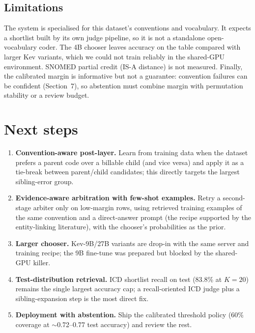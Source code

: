 \documentclass[11pt]{article}
\begin{document}
\subsection{Limitations}
The system is specialised for this dataset's conventions and vocabulary. It expects a
shortlist built by its own judge pipeline, so it is not a standalone open-vocabulary coder.
The 4B chooser leaves accuracy on the table compared with larger Kev variants, which we
could not train reliably in the shared-GPU environment. SNOMED partial credit (IS-A
distance) is not measured. Finally, the calibrated margin is informative but not a guarantee:
convention failures can be confident (Section~7), so abstention must combine margin with
permutation stability or a review budget.

\section{Next steps}
\begin{enumerate}[leftmargin=1.2em]
  \item \textbf{Convention-aware post-layer.} Learn from training data when the dataset
  prefers a parent code over a billable child (and vice versa) and apply it as a tie-break
  between parent/child candidates; this directly targets the largest sibling-error group.
  \item \textbf{Evidence-aware arbitration with few-shot examples.} Retry a second-stage
  arbiter only on low-margin rows, using retrieved training examples of the same convention
  and a direct-answer prompt (the recipe supported by the entity-linking literature), with
  the chooser's probabilities as the prior.
  \item \textbf{Larger chooser.} Kev-9B/27B variants are drop-in with the same server and
  training recipe; the 9B fine-tune was prepared but blocked by the shared-GPU killer.
  \item \textbf{Test-distribution retrieval.} ICD shortlist recall on test (83.8\% at
  $K{=}20$) remains the single largest accuracy cap; a recall-oriented ICD judge plus a
  sibling-expansion step is the most direct fix.
  \item \textbf{Deployment with abstention.} Ship the calibrated threshold policy (60\%
  coverage at $\sim$0.72--0.77 test accuracy) and review the rest.
\end{enumerate}

\appendix
\end{document}
